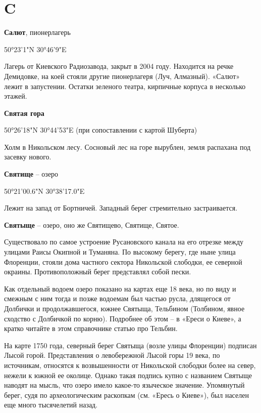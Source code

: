 \chapter*{C}

\textbf{Салют}, пионерлагерь

50°23'1"N 30°46'9"E

Лагерь от Киевского Радиозавода, закрыт в 2004 году. Находится на речке Демидовке, на коей стояли другие пионерлагеря (Луч, Алмазный). «Салют» лежит в запустении. Остатки зеленого театра, кирпичные корпуса в несколько этажей.\\

\medskip


\textbf{Святая гора}

50°26'18"N 30°44'53"E (при сопоставлении с картой Шуберта)

Холм в Никольском лесу. Сосновый лес на горе вырублен, земля распахана под засевку нового.\\

\medskip


\textbf{Святище} – озеро 

50°21'00.6"N 30°38'17.0"E

Лежит на запад от Бортничей. Западный берег стремительно застраивается.\\

\medskip


\textbf{Святыще} – озеро, оно же Святищево, Святище, Святое. 

Существовало по самое устроение Русановского канала на его отрезке между улицами Раисы Окипной и Туманяна. По высокому берегу, где ныне улица Флоренции, стояли дома частного сектора Никольской слободки, ее северной окраины. Противоположный берег представлял собой пески.

Как отдельный водоем озеро показано на картах еще 18 века, но по виду и смежным с ним тогда и позже водоемам был частью русла, длящегося от Долбички и продолжавшегося, южнее Святыща, Тельбином (Толбином, явное сходство с Долбичкой по корню). Подробнее об этом – в «Ереси о Киеве», а кратко читайте в этом справочнике статью про Тельбин.

На карте 1750 года, северный берег Святыща (возле улицы Флоренции) подписан Лысой горой. Представления о левобережной Лысой горы 19 века, по источникам, относятся к возвышенности от Никольской слободки более на север, нежели к южной ее околице. Однако такая подпись купно с названием Святыще наводят на мысль, что озеро имело какое-то языческое значение. Упомянутый берег, судя по археологическим раскопкам (см. «Ересь о Киеве»), был населен еще много тысячелетий назад.

